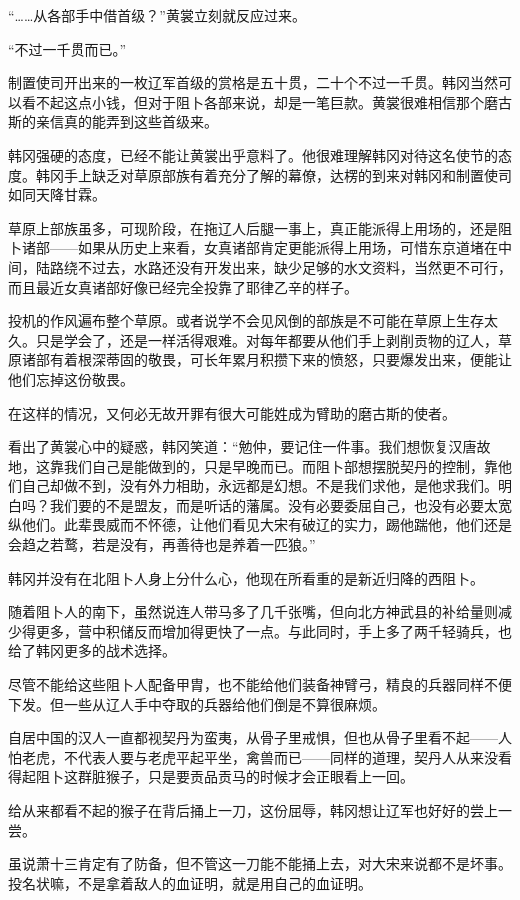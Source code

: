 “……从各部手中借首级？”黄裳立刻就反应过来。

“不过一千贯而已。”

制置使司开出来的一枚辽军首级的赏格是五十贯，二十个不过一千贯。韩冈当然可以看不起这点小钱，但对于阻卜各部来说，却是一笔巨款。黄裳很难相信那个磨古斯的亲信真的能弄到这些首级来。

韩冈强硬的态度，已经不能让黄裳出乎意料了。他很难理解韩冈对待这名使节的态度。韩冈手上缺乏对草原部族有着充分了解的幕僚，达楞的到来对韩冈和制置使司如同天降甘霖。

草原上部族虽多，可现阶段，在拖辽人后腿一事上，真正能派得上用场的，还是阻卜诸部——如果从历史上来看，女真诸部肯定更能派得上用场，可惜东京道堵在中间，陆路绕不过去，水路还没有开发出来，缺少足够的水文资料，当然更不可行，而且最近女真诸部好像已经完全投靠了耶律乙辛的样子。

投机的作风遍布整个草原。或者说学不会见风倒的部族是不可能在草原上生存太久。只是学会了，还是一样活得艰难。对每年都要从他们手上剥削贡物的辽人，草原诸部有着根深蒂固的敬畏，可长年累月积攒下来的愤怒，只要爆发出来，便能让他们忘掉这份敬畏。

在这样的情况，又何必无故开罪有很大可能姓成为臂助的磨古斯的使者。

看出了黄裳心中的疑惑，韩冈笑道：“勉仲，要记住一件事。我们想恢复汉唐故地，这靠我们自己是能做到的，只是早晚而已。而阻卜部想摆脱契丹的控制，靠他们自己却做不到，没有外力相助，永远都是幻想。不是我们求他，是他求我们。明白吗？我们要的不是盟友，而是听话的藩属。没有必要委屈自己，也没有必要太宽纵他们。此辈畏威而不怀德，让他们看见大宋有破辽的实力，踢他踹他，他们还是会趋之若鹜，若是没有，再善待也是养着一匹狼。”

韩冈并没有在北阻卜人身上分什么心，他现在所看重的是新近归降的西阻卜。

随着阻卜人的南下，虽然说连人带马多了几千张嘴，但向北方神武县的补给量则减少得更多，营中积储反而增加得更快了一点。与此同时，手上多了两千轻骑兵，也给了韩冈更多的战术选择。

尽管不能给这些阻卜人配备甲胄，也不能给他们装备神臂弓，精良的兵器同样不便下发。但一些从辽人手中夺取的兵器给他们倒是不算很麻烦。

自居中国的汉人一直都视契丹为蛮夷，从骨子里戒惧，但也从骨子里看不起——人怕老虎，不代表人要与老虎平起平坐，禽兽而已——同样的道理，契丹人从来没看得起阻卜这群脏猴子，只是要贡品贡马的时候才会正眼看上一回。

给从来都看不起的猴子在背后捅上一刀，这份屈辱，韩冈想让辽军也好好的尝上一尝。

虽说萧十三肯定有了防备，但不管这一刀能不能捅上去，对大宋来说都不是坏事。投名状嘛，不是拿着敌人的血证明，就是用自己的血证明。
